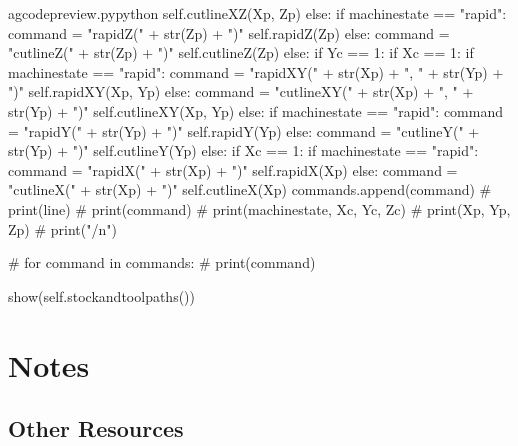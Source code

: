 \documentclass{ltxdoc}
\begin{document}
\begin{writecode}{a}{gcodepreview.py}{python}
                                self.cutlineXZ(Xp, Zp)
                        else:
                            if machinestate == "rapid":
                                command = "rapidZ(" + str(Zp) + ")"
                                self.rapidZ(Zp)
                            else: 
                                command = "cutlineZ(" + str(Zp) + ")"
                                self.cutlineZ(Zp)
                else:
                    if Yc == 1:
                        if Xc == 1:
                            if machinestate == "rapid":
                                command = "rapidXY(" + str(Xp) + ", " + str(Yp) + ")"
                                self.rapidXY(Xp, Yp)
                            else: 
                                command = "cutlineXY(" + str(Xp) + ", " + str(Yp) + ")"
                                self.cutlineXY(Xp, Yp)
                        else:
                            if machinestate == "rapid":
                                command = "rapidY(" + str(Yp) + ")"
                                self.rapidY(Yp)
                            else: 
                                command = "cutlineY(" + str(Yp) + ")"
                                self.cutlineY(Yp)
                    else:
                        if Xc == 1:
                            if machinestate == "rapid":
                                command = "rapidX(" + str(Xp) + ")"
                                self.rapidX(Xp)
                            else: 
                                command = "cutlineX(" + str(Xp) + ")"
                                self.cutlineX(Xp)
                commands.append(command)
#                print(line)
#                print(command)
#                print(machinestate, Xc, Yc, Zc)
#                print(Xp, Yp, Zp)
#                print("/n")

#        for command in commands:
#            print(command)

        show(self.stockandtoolpaths())

\end{writecode}
\addtocounter{gcpy}{137}

\section{Notes}

\subsection{Other Resources}
\end{document}
